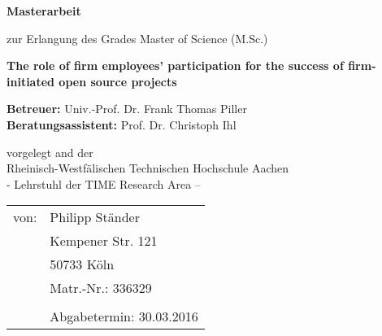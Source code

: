 \begin{center}
    \vspace{3.5cm}

    {\huge{\textbf{Masterarbeit}}}
    \vspace{0.5cm}

    \Large{zur Erlangung des Grades Master of Science (M.Sc.)}

    \vspace{2.5cm}

    {\Large{\bf The role of firm employees' participation for the success of firm-initiated open source projects}}

    \vspace{3cm}


    \large

    \textbf{Betreuer:} Univ.-Prof. Dr. Frank Thomas Piller \\
    \textbf{Beratungsassistent:} Prof. Dr. Christoph Ihl \\

    \vspace{3cm}



    vorgelegt and der \\
    Rheinisch-Westfälischen Technischen Hochschule Aachen \\
    - Lehrstuhl der TIME Research Area –

    \vspace{3cm}

    \begin{table}[!h]
    \centering
    \large
    \begin{tabular}{ll}
    von: & Philipp Ständer       \\
         & Kempener Str. 121        \\
         & 50733 Köln               \\
         & Matr.-Nr.: 336329        \\
         &                          \\
         & Abgabetermin: 30.03.2016
    \end{tabular}
    \end{table}


\end{center}


\normalsize
